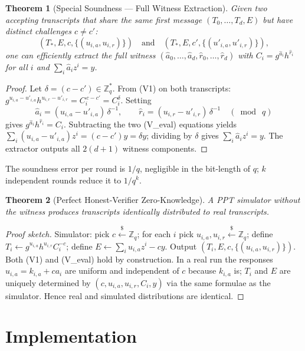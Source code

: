 \documentclass[11pt,a4paper]{article}
\newtheorem{theorem}{Theorem}
\begin{document}
\begin{theorem}[Special Soundness --- Full Witness Extraction]
Given two accepting transcripts that share the same first message
$(T_0,\dots,T_d,E)$ but have distinct challenges $c\neq c'$:
\[
(T_\ast,E,c,\{(u_{i,a},u_{i,r})\})\quad\text{and}\quad
(T_\ast,E,c',\{(u'_{i,a},u'_{i,r})\}),
\]
one can efficiently extract the full witness
$(\hat a_0,\dots,\hat a_d,\hat r_0,\dots,\hat r_d)$ with
$C_i = g^{\hat a_i}h^{\hat r_i}$ for all $i$ and
$\sum_i \hat a_i z^{i} = y$.
\end{theorem}
\begin{proof}
Let $\delta = (c-c') \in \mathbb{Z}_q^{*}$. From (V1) on both transcripts:
$g^{u_{i,a}-u'_{i,a}} h^{u_{i,r}-u'_{i,r}} = C_i^{\,c-c'} = C_i^{\delta}$.
Setting
\[
\hat a_i = (u_{i,a}-u'_{i,a})\,\delta^{-1},\qquad
\hat r_i = (u_{i,r}-u'_{i,r})\,\delta^{-1}\quad (\bmod\ q)
\]
gives $g^{\hat a_i}h^{\hat r_i}=C_i$. Subtracting the two (V\_eval)
equations yields $\sum_i(u_{i,a}-u'_{i,a})z^{i} = (c-c')y = \delta y$;
dividing by $\delta$ gives $\sum_i \hat a_i z^{i} = y$. The extractor
outputs all $2(d+1)$ witness components.
\end{proof}

The soundness error per round is $1/q$, negligible in the bit-length of
$q$; $k$ independent rounds reduce it to $1/q^{k}$.

\begin{theorem}[Perfect Honest-Verifier Zero-Knowledge]
A PPT simulator without the witness produces transcripts identically
distributed to real transcripts.
\end{theorem}
\begin{proof}[Proof sketch]
Simulator: pick $c \xleftarrow{\$} \mathbb{Z}_q$; for each $i$ pick
$u_{i,a}, u_{i,r} \xleftarrow{\$} \mathbb{Z}_q$; define
$T_i \leftarrow g^{u_{i,a}}h^{u_{i,r}} C_i^{-c}$; define
$E \leftarrow \sum_i u_{i,a}z^{i} - cy$. Output
$(T_i, E, c, \{(u_{i,a},u_{i,r})\})$. Both (V1) and (V\_eval) hold by
construction. In a real run the responses $u_{i,a}=k_{i,a}+ca_i$ are
uniform and independent of $c$ because $k_{i,a}$ is; $T_i$ and $E$ are
uniquely determined by $(c,u_{i,a},u_{i,r},C_i,y)$ via the same formulae
as the simulator. Hence real and simulated distributions are identical.
\end{proof}

\section{Implementation}
\end{document}
